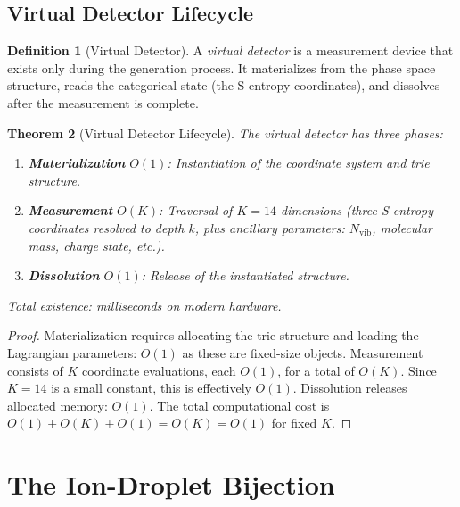 \documentclass[11pt,twocolumn,a4paper]{article}
\newtheorem{theorem}{Theorem}[section]
\theoremstyle{definition}
\newtheorem{definition}[theorem]{Definition}
\theoremstyle{remark}
\newcommand{\Nvib}{N_{\mathrm{vib}}}
\begin{document}
\subsection{Virtual Detector Lifecycle}
\label{sec:virtual-detector}

\begin{definition}[Virtual Detector]
\label{def:virtual-detector}
A \emph{virtual detector} is a measurement device that exists only during the generation process. It materializes from the phase space structure, reads the categorical state (the S-entropy coordinates), and dissolves after the measurement is complete.
\end{definition}

\begin{theorem}[Virtual Detector Lifecycle]
\label{thm:virtual-detector}
The virtual detector has three phases:
\begin{enumerate}[label=(\roman*)]
  \item \textbf{Materialization} $O(1)$: Instantiation of the coordinate system and trie structure.
  \item \textbf{Measurement} $O(K)$: Traversal of $K = 14$ dimensions (three S-entropy coordinates resolved to depth $k$, plus ancillary parameters: $\Nvib$, molecular mass, charge state, etc.).
  \item \textbf{Dissolution} $O(1)$: Release of the instantiated structure.
\end{enumerate}
Total existence: milliseconds on modern hardware.
\end{theorem}

\begin{proof}
Materialization requires allocating the trie structure and loading the Lagrangian parameters: $O(1)$ as these are fixed-size objects. Measurement consists of $K$ coordinate evaluations, each $O(1)$, for a total of $O(K)$. Since $K = 14$ is a small constant, this is effectively $O(1)$. Dissolution releases allocated memory: $O(1)$. The total computational cost is $O(1) + O(K) + O(1) = O(K) = O(1)$ for fixed $K$.
\end{proof}

\section{The Ion-Droplet Bijection}
\label{sec:ion-droplet}
\end{document}
